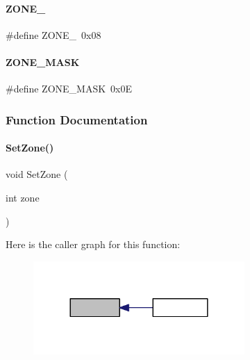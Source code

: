 \mbox{\label{a00062_ac8305e4b22f8761300735a8170296fc9}} 
\paragraph{Z\+O\+N\+E\+\_}
{\footnotesize\ttfamily \#define Z\+O\+N\+E\+\_~0x08}

\mbox{\label{a00062_ad6772116e293d8efd86db48eb5ecb7d5}} 
\paragraph{Z\+O\+N\+E\+\_\+\+M\+A\+SK}
{\footnotesize\ttfamily \#define Z\+O\+N\+E\+\_\+\+M\+A\+SK~0x0E}



\subsubsection{Function Documentation}
\mbox{\label{a00062_aac9584e7c43e5e7dfe6f740d2e52a545}} 
\paragraph{Set\+Zone()}
{\footnotesize\ttfamily void Set\+Zone (\begin{DoxyParamCaption}\item[{int}]{zone }\end{DoxyParamCaption})}

Here is the caller graph for this function\+:
\nopagebreak
\begin{figure}[H]
\begin{center}
\leavevmode
\includegraphics[width=228pt]{a00062_aac9584e7c43e5e7dfe6f740d2e52a545_icgraph}
\end{center}
\end{figure}
\mbox{\label{a00062_aefe3a1f3ce1ce2aef86b493a3331bf2e}} 

